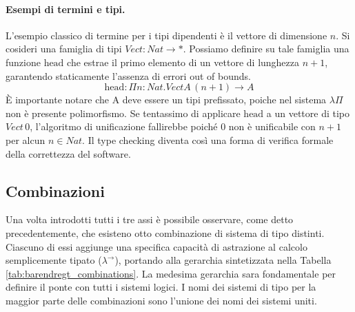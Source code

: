 \paragraph{Esempi di termini e tipi.}
L'esempio classico di termine per i tipi dipendenti è il vettore di dimensione $n$. Si cosideri una famiglia di tipi $Vect : Nat \to \ast$. 
Possiamo definire su tale famiglia una funzione $\text{head}$ che estrae il primo elemento di un vettore di lunghezza $n+1$, garantendo staticamente 
l'assenza di errori out of bounds.
\begin{equation}
    \text{head} : \Pi n : Nat. VectA \, (n+1) \to A
\end{equation}
È importante notare che A deve essere un tipi prefissato, poiche nel sistema $\lambda\Pi$ non è presente polimorfismo. Se tentassimo di applicare 
$\text{head}$ a un vettore di tipo $Vect \, 0$, l'algoritmo di unificazione fallirebbe poiché $0$ non è unificabile con $n+1$ per alcun $n \in Nat$. 
Il type checking diventa così una forma di verifica formale della correttezza del software.

\subsection{Combinazioni}
Una volta introdotti tutti i tre assi è possibile osservare, come detto precedentemente, che esisteno otto combinazione di sistema di tipo distinti.
Ciascuno di essi aggiunge una specifica capacità di astrazione al calcolo semplicemente tipato ($\lambda^\to$), portando alla gerarchia sintetizzata 
nella Tabella \ref{tab:barendregt_combinations}. La medesima gerarchia sara fondamentale per definire il ponte con tutti i sistemi logici. I nomi dei 
sistemi di tipo per la maggior parte delle combinazioni sono l'unione dei nomi dei sistemi uniti.

